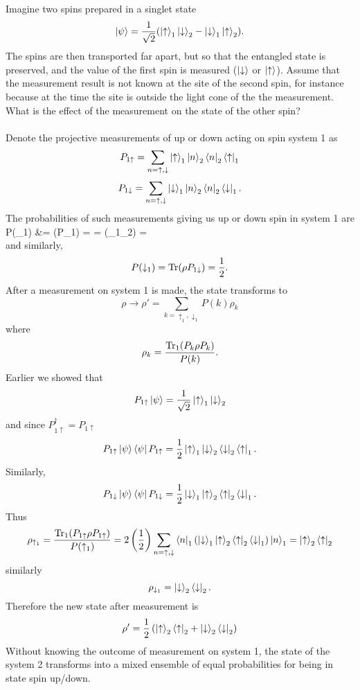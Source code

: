 \documentclass[10pt,letterpaper]{article}
\begin{document}
	Imagine two spins prepared in a singlet state
	\[
		\ket\psi = \frac{1}{\sqrt 2}( \ket\uparrow_1 \ket\downarrow_2 - \ket\downarrow_1\ket\uparrow_2).
	\]
	The spins are then transported far apart, but so that the entangled state is preserved, and the value of the first spin is
	measured ($\ket\downarrow$ or $\ket\uparrow$). Assume that the measurement result is not known at the site of
	the second spin, for instance because at the time the site is outside the light cone of the the measurement. What
	is the effect of the measurement on the state of the other spin?
	\\ \\
	Denote the projective measurements of up or down acting on spin system 1 as
	\[
		P_{1\uparrow} = \sum_{n=\uparrow,\downarrow} \ket\uparrow_1\ket n_2 \bra n_2\bra\uparrow_1
	\]
	\[
		P_{1\downarrow} = \sum_{n=\uparrow,\downarrow} \ket\downarrow_1\ket n_2 \bra n_2\bra\downarrow_1.
	\]
	The probabilities of such measurements giving us up or down spin in system 1 are
	\ba
		P(\uparrow_1) &= \tr(\rho P_{1\uparrow}) =  = \bra\psi(\ket\uparrow_1\ket\downarrow_2) =  \\
	\ea
	and similarly,
	\[
		P(\downarrow_1) = \text{Tr}(\rho P_{1\downarrow}) = \frac{1}{2}.
	\]
	After a measurement on system 1 is made, the state transforms to 
	\[
		\rho \to \rho' = \sum_{k = \uparrow_1,\downarrow_1}P(k)\rho_k
	\]
	where
	\[
		\rho_k = \frac{\text{Tr}_1(P_k\rho P_k)}{P(k)}.
	\]
	Earlier we showed that
	\[
		P_{1\uparrow}\ket{\psi} = \frac{1}{\sqrt 2} \ket\uparrow_1\ket\downarrow_2
	\]
	and since $P_{1\uparrow}^\dag = P_{1\uparrow}$ 
	\[
		P_{1\uparrow}\ket\psi\bra\psi P_{1\uparrow} = \frac{1}{2}\ket\uparrow_1\ket\downarrow_2\bra\downarrow_2
		\bra\uparrow_1.
	\]
	Similarly,
	\[
		P_{1\downarrow}\ket\psi\bra\psi P_{1\downarrow} = \frac{1}{2}\ket\downarrow_1\ket\uparrow_2\bra\uparrow_2
		\bra\downarrow_1.
	\]
	Thus
	\[
		\rho_{\uparrow_1}=\frac{\text{Tr}_1(P_{1\uparrow}\rho P_{1\uparrow})}{P(\uparrow_1)} = 2\left(\frac{1}{2}\right)
		\sum_{n = \uparrow,\downarrow} \bra n_1
		(\ket\downarrow_1\ket\uparrow_2\bra\uparrow_2 \bra\downarrow_1)\ket n_1 = \ket\uparrow_2
		\bra\uparrow_2
	\]
	similarly
	\[
		\rho_{\downarrow_1} = \ket\downarrow_2\bra\downarrow_2.
	\]
	Therefore the new state after measurement is
	\[
		\rho' = \frac{1}{2}\left( \ket\uparrow_2\bra\uparrow_2+\ket\downarrow_2\bra\downarrow_2\right)
	\]
	Without knowing the outcome of measurement on system 1, the state of the system 2 transforms into a mixed
	ensemble of equal probabilities for being in state spin up/down. \\ \\
\end{document}
